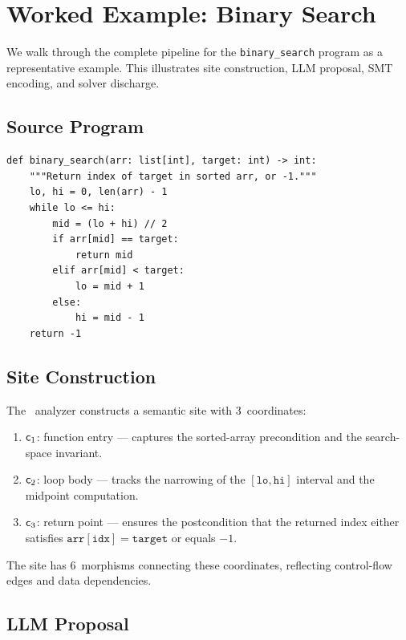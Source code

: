 \documentclass[11pt]{article}
\begin{document}
\section{Worked Example: Binary Search}\label{sec:worked-example}

We walk through the complete pipeline for the \texttt{binary\_search}
program as a representative example.  This illustrates site construction,
LLM proposal, SMT encoding, and solver discharge.

\subsection{Source Program}

\begin{lstlisting}[style=jugeo-python]
def binary_search(arr: list[int], target: int) -> int:
    """Return index of target in sorted arr, or -1."""
    lo, hi = 0, len(arr) - 1
    while lo <= hi:
        mid = (lo + hi) // 2
        if arr[mid] == target:
            return mid
        elif arr[mid] < target:
            lo = mid + 1
        else:
            hi = mid - 1
    return -1
\end{lstlisting}

\subsection{Site Construction}

The \JuGeo\ analyzer constructs a semantic site with 3~coordinates:
\begin{enumerate}[noitemsep]
  \item $\mathsf{c}_1$: function entry --- captures the sorted-array
        precondition and the search-space invariant.
  \item $\mathsf{c}_2$: loop body --- tracks the narrowing of the
        $[\mathtt{lo}, \mathtt{hi}]$ interval and the midpoint
        computation.
  \item $\mathsf{c}_3$: return point --- ensures the postcondition that the
        returned index either satisfies
        $\mathtt{arr}[\mathtt{idx}] = \mathtt{target}$ or equals $-1$.
\end{enumerate}
The site has 6~morphisms connecting these coordinates, reflecting
control-flow edges and data dependencies.

\subsection{LLM Proposal}
\end{document}
